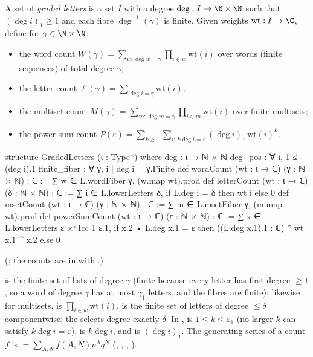 \begin{definition}\label{ch19:def:letters}
A set of \emph{graded letters} is a set $I$ with a degree $\deg:I\to\N\times\N$ such that $(\deg i)_1\ge1$ and each fibre
$\deg^{-1}(\gamma)$ is finite.  Given weights $\mathrm{wt}:I\to\C$, define for $\gamma\in\N\times\N$:
\begin{itemize}
\item the word count $W(\gamma)=\sum_{w:\deg w=\gamma}\prod_{i\in w}\mathrm{wt}(i)$ over words (finite sequences) of total degree $\gamma$;
\item the letter count $\ell(\gamma)=\sum_{\deg i=\gamma}\mathrm{wt}(i)$;
\item the multiset count $M(\gamma)=\sum_{m:\deg m=\gamma}\prod_{i\in m}\mathrm{wt}(i)$ over finite multisets;
\item the power-sum count $P(\varepsilon)=\sum_{k\ge1}\sum_{i:\,k\deg i=\varepsilon}(\deg i)_1\,\mathrm{wt}(i)^k$.
\end{itemize}
\end{definition}
\begin{leancode}
structure GradedLetters (ι : Type*) where
  deg : ι → ℕ × ℕ
  deg_pos : ∀ i, 1 ≤ (deg i).1
  finite_fiber : ∀ γ, {i | deg i = γ}.Finite
def wordCount (wt : ι → ℂ) (γ : ℕ × ℕ) : ℂ := ∑ w ∈ L.wordFiber γ, (w.map wt).prod
def letterCount (wt : ι → ℂ) (δ : ℕ × ℕ) : ℂ :=
  ∑ i ∈ L.lowerLetters δ, if L.deg i = δ then wt i else 0
def msetCount (wt : ι → ℂ) (γ : ℕ × ℕ) : ℂ := ∑ m ∈ L.msetFiber γ, (m.map wt).prod
def powerSumCount (wt : ι → ℂ) (ε : ℕ × ℕ) : ℂ :=
  ∑ x ∈ L.lowerLetters ε ×ˢ Icc 1 ε.1,
    if x.2 • L.deg x.1 = ε then ((L.deg x.1).1 : ℂ) * wt x.1 ^ x.2 else 0
\end{leancode}
(; the counts are in  with
.)
\begin{dictionary}
 is the finite set of lists of degree $\gamma$ (finite because every letter has first degree $\ge1$,
so a word of degree $\gamma$ has at most $\gamma_1$ letters, and the fibres are finite);  likewise
for multisets.   is $\prod_{i\in w}\mathrm{wt}(i)$.   is the finite set of letters
of degree $\le\delta$ componentwise; the  selects degree exactly $\delta$.  In ,
 is $1\le k\le\varepsilon_1$ (no larger $k$ can satisfy $k\deg i=\varepsilon$),  is $k\deg i$,
and  is $(\deg i)_1$.  The generating series of a count $f$ is
 $=\sum_{A,N}f(A,N)p^Aq^N$ (, , ,
).
\end{dictionary}

